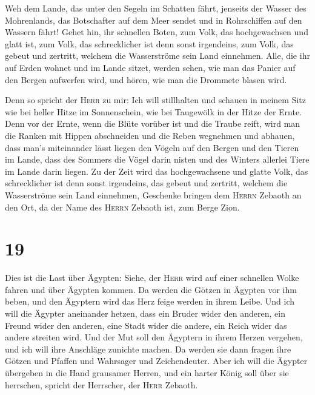  Weh dem Lande, das unter den Segeln im Schatten fährt,
jenseits der Wasser des Mohrenlands,  das Botschafter auf
dem Meer sendet und in Rohrschiffen auf den Wassern fährt! Gehet hin,
ihr schnellen Boten, zum Volk, das hochgewachsen und glatt ist, zum
Volk, das schrecklicher ist denn sonst irgendeins, zum Volk, das gebeut
und zertritt, welchem die Wasserströme sein Land einnehmen.
 Alle, die ihr auf Erden wohnet und im Lande sitzet,
werden sehen, wie man das Panier auf den Bergen aufwerfen wird, und
hören, wie man die Drommete blasen wird.

 Denn so spricht der \textsc{Herr} zu mir: Ich will
stillhalten und schauen in meinem Sitz wie bei heller Hitze im
Sonnenschein, wie bei Taugewölk in der Hitze der Ernte. 
Denn vor der Ernte, wenn die Blüte vorüber ist und die Traube reift,
wird man die Ranken mit Hippen abschneiden und die Reben wegnehmen und
abhauen,  dass man's miteinander lässt liegen den Vögeln
auf den Bergen und den Tieren im Lande, dass des Sommers die Vögel darin
nisten und des Winters allerlei Tiere im Lande darin liegen.
 Zu der Zeit wird das hochgewachsene und glatte Volk, das
schrecklicher ist denn sonst irgendeins, das gebeut und zertritt,
welchem die Wasserströme sein Land einnehmen, Geschenke bringen dem
\textsc{Herrn} Zebaoth an den Ort, da der Name des \textsc{Herrn}
Zebaoth ist, zum Berge Zion.

\hypertarget{section-18}{%
\section{19}\label{section-18}}

 Dies ist die Last über Ägypten: Siehe, der \textsc{Herr}
wird auf einer schnellen Wolke fahren und über Ägypten kommen. Da werden
die Götzen in Ägypten vor ihm beben, und den Ägyptern wird das Herz
feige werden in ihrem Leibe.  Und ich will die Ägypter
aneinander hetzen, dass ein Bruder wider den anderen, ein Freund wider
den anderen, eine Stadt wider die andere, ein Reich wider das andere
streiten wird.  Und der Mut soll den Ägyptern in ihrem
Herzen vergehen, und ich will ihre Anschläge zunichte machen. Da werden
sie dann fragen ihre Götzen und Pfaffen und Wahrsager und Zeichendeuter.
 Aber ich will die Ägypter übergeben in die Hand grausamer
Herren, und ein harter König soll über sie herrschen, spricht der
Herrscher, der \textsc{Herr} Zebaoth.


